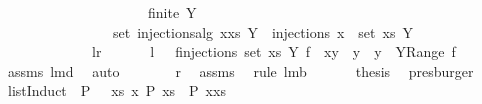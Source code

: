 \begin{isabellebody}
\ \ \ \ \ \ \ \ \ \ \ \ \ \ \ \ \ \ \ \ \ {\isachardoublequoteopen}finite\ Y{\isachardoublequoteclose}\ \isanewline
\ \ \ \ \ \ \ \ \ \ \ \ \ \ \ \ {\isachardoublequoteopen}set\ {\isacharparenleft}injections{\isacharunderscore}alg\ {\isacharparenleft}x{\isacharhash}xs{\isacharparenright}\ Y{\isacharparenright}\ {\isacharequal}\ injections\ {\isacharparenleft}{\isacharbraceleft}x{\isacharbraceright}\ {\isasymunion}\ set\ xs{\isacharparenright}\ Y{\isachardoublequoteclose}\ \isanewline
\ \ \ \ \ \ \ \ \ \ \ \ {\isacharparenleft}\ {\isachardoublequoteopen}{\isacharquery}l{\isacharequal}{\isacharquery}r{\isachardoublequoteclose}{\isacharparenright}\isanewline
%
\isadelimproof
%
\endisadelimproof
%
\isatagproof
{}\isamarkupfalse%
\ {\isacharminus}\ \isanewline
\ \ \isamarkupfalse%
\ {\isachardoublequoteopen}{\isacharquery}l\ {\isacharequal}\ {\isacharparenleft}{\isasymUnion}\ f{\isasymin}injections\ {\isacharparenleft}set\ xs{\isacharparenright}\ Y{\isachardot}\ {\isacharbraceleft}f\ {\isacharplus}{\isacharasterisk}\ {\isacharbraceleft}{\isacharparenleft}x{\isacharcomma}y{\isacharparenright}{\isacharbraceright}\ {\isacharbar}\ y\ {\isachardot}\ y\ {\isasymin}\ Y{\isacharminus}Range\ f{\isacharbraceright}{\isacharparenright}{\isachardoublequoteclose}\ \isanewline
\ \ \isamarkupfalse%
\ assms{\isacharparenleft}{}{\isacharcomma}{}{\isacharparenright}\ lm{}{}d\ \isamarkupfalse%
\ auto\isanewline
\ \ \isamarkupfalse%
\ \isamarkupfalse%
\ {\isachardoublequoteopen}{\isachardot}{\isachardot}{\isachardot}\ {\isacharequal}\ {\isacharquery}r{\isachardoublequoteclose}\ \isamarkupfalse%
\ assms{\isacharparenleft}{}{\isacharparenright}\ \isamarkupfalse%
\ {\isacharparenleft}rule\ lm{}{}b{\isacharparenright}\ \isanewline
\ \ \isamarkupfalse%
\ \isamarkupfalse%
\ {\isacharquery}thesis\ \isamarkupfalse%
\ presburger\isanewline
{}\isamarkupfalse%
%
\endisatagproof
{\isafoldproof}%
%
\isadelimproof
\isanewline
%
\endisadelimproof
\isanewline
{}\isamarkupfalse%
\ listInduct{\isacharcolon}\ \ {\isachardoublequoteopen}P\ {\isacharbrackleft}{\isacharbrackright}{\isachardoublequoteclose}\ {\isachardoublequoteopen}{\isasymforall}\ xs\ x{\isachardot}\ P\ xs\ {\isasymlongrightarrow}\ P\ {\isacharparenleft}x{\isacharhash}xs{\isacharparenright}{\isachardoublequoteclose}\ \isanewline

\end{isabellebody}
